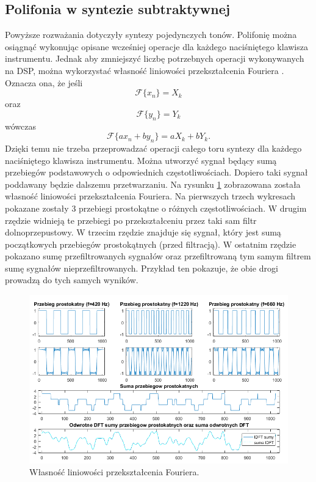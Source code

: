 \subsection{Polifonia w syntezie subtraktywnej}
Powyższe rozważania dotyczyły syntezy pojedynczych tonów. Polifonię można osiągnąć wykonując opisane wcześniej operacje dla każdego naciśniętego klawisza instrumentu. Jednak aby zmniejszyć liczbę potrzebnych operacji wykonywanych na DSP, można wykorzystać własność liniowości przekształcenia Fouriera \cite{schafer}. Oznacza ona, że jeśli
 \begin{equation} \label{equ:sub_5}
 \mathcal{F}\{x_n\} = X_k
 \end{equation}
 oraz 
  \begin{equation} \label{equ:sub_6}
 \mathcal{F}\{y_n\} = Y_k
 \end{equation}
 wówczas
  \begin{equation} \label{equ:sub_7}
\mathcal{F}\{ax_n + by_n\} = aX_k + bY_k.
\end{equation} 
Dzięki temu nie trzeba przeprowadzać operacji całego toru syntezy dla każdego naciśniętego klawisza instrumentu. Można utworzyć sygnał będący sumą przebiegów podstawowych o odpowiednich częstotliwościach. Dopiero taki sygnał poddawany będzie dalszemu przetwarzaniu. Na rysunku \ref{rys:sub_linearity}	zobrazowana została własność liniowości przekształcenia Fouriera. Na pierwszych trzech wykresach pokazane zostały 3 przebiegi prostokątne o różnych częstotliwościach. W drugim rzędzie widnieją te przebiegi po przekształceniu przez taki sam filtr dolnoprzepustowy. W trzecim rzędzie znajduje się sygnał, który jest sumą początkowych przebiegów prostokątnych (przed filtracją). W ostatnim rzędzie pokazano sumę przefiltrowanych sygnałów oraz przefiltrowaną tym samym filtrem sumę sygnałów nieprzefiltrowanych. Przykład ten pokazuje, że obie drogi prowadzą do tych samych wyników.
\begin{figure}[H]
	\centering
	\includegraphics[width=16cm]{grafiki/sub_linearity}
	\captionsetup{justification=centering}
	\caption{Własność liniowości przekształcenia Fouriera.}
	\label{rys:sub_linearity}
\end{figure}

